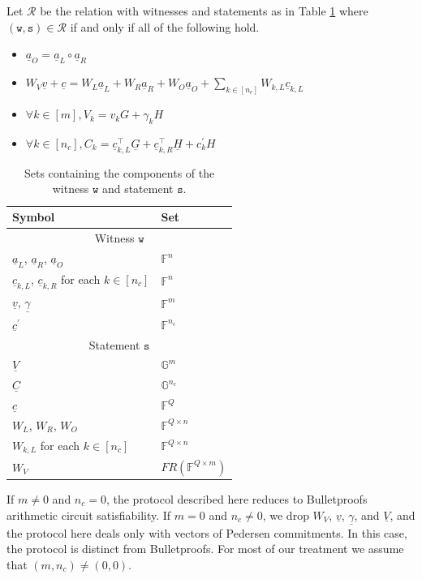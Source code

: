 \documentclass{article}
\theoremstyle{definition}
\newcommand{\GG}{\mathbb{G}}
\newcommand{\FF}{\mathbb{F}}
\begin{document}
Let $\mathcal{R}$ be the relation with witnesses and statements as in Table \ref{tab:witstmt} where $(\texttt{w}, \texttt{s}) \in \mathcal{R}$ if and only if all of the following hold.
\begin{itemize}
\item $\underline{a}_O = \underline{a}_L \circ \underline{a}_R $
\item $W_V \underline{v} + \underline{c} = W_L \underline{a}_L + W_R \underline{a}_R + W_O \underline{a}_O + \sum_{k \in [n_c]} W_{k,L} \underline{c}_{k,L}$
\item $\forall k \in [m], V_k = v_k G + \gamma_k H$
\item $\forall k \in [n_c], C_k = \underline{c}_{k,L}^\top \underline{G} + \underline{c}_{k,R}^\top \underline{H} + c_k^\prime H$
\end{itemize}

\begin{table}[h!]
\centering
\begin{longtable}{|l|l|}
\hline
Symbol & Set \\
\hline
\multicolumn{2}{|c|}{Witness $\texttt{w}$} \\
\hline
$\underline{a}_L$, $\underline{a}_R$, $\underline{a}_O$ & $\FF^n$ \\
$\underline{c}_{k,L}$, $\underline{c}_{k,R}$ for each $k \in [n_c]$ & $\FF^n$ \\
$\underline{v}$, $\underline{\gamma}$ & $\FF^m$ \\
$\underline{c}^\prime$ & $\FF^{n_c}$ \\
\hline
\multicolumn{2}{|c|}{Statement $\texttt{s}$} \\
\hline
$\underline{V}$ & $\GG^m$ \\
$\underline{C}$ & $\GG^{n_c}$ \\
$\underline{c}$ & $\FF^Q$ \\
$W_L$, $W_R$, $W_O$ & $\FF^{Q \times n}$ \\
$W_{k,L}$ for each $k \in [n_c]$ & $\FF^{Q \times n}$ \\
$W_V$ & $FR(\FF^{Q \times m})$ \\
\hline
\end{longtable}
\caption{Sets containing the components of the witness $\texttt{w}$ and statement $\texttt{s}$.}
\label{tab:witstmt}
\end{table}






If $m \neq 0$ and $n_c = 0$, the protocol described here reduces to Bulletproofs arithmetic circuit satisfiability. If $m = 0$ and $n_c \neq 0$, we drop $W_V$, $\underline{v}$, $\underline{\gamma}$, and $\underline{V}$, and the protocol here deals only with vectors of Pedersen commitments. In this case, the protocol is distinct from Bulletproofs. For most of our treatment we assume that $(m, n_c) \neq (0,0)$.
\end{document}
